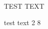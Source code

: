 \clearpage
\makeatletter
\efloat@restorefloats
\makeatother


\begin{appendix}
\section{}
TEST TEXT

test text 2 8
\end{appendix}
